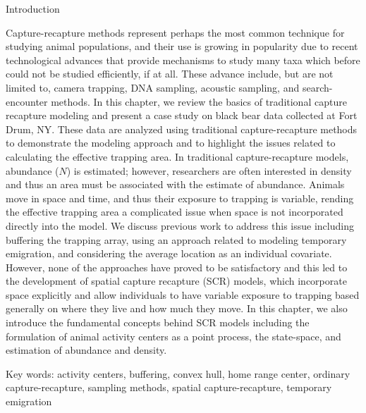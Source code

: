 
Introduction


Capture-recapture methods represent perhaps the most common technique
for studying animal populations, and their use is growing in
popularity due to recent technological advances that provide
mechanisms to study many taxa which before could not be studied
efficiently, if at all. These advance include, but are not limited to,
camera trapping, DNA sampling, acoustic sampling, and search-encounter
methods.  In this chapter, we review the basics of traditional capture
recapture modeling and present a case study on black bear data
collected at Fort Drum, NY.  These data are analyzed using traditional
capture-recapture methods to demonstrate the modeling approach and to
highlight the issues related to calculating the effective trapping
area.  In traditional capture-recapture models, abundance ($N$) is
estimated; however, researchers are often interested in density and
thus an area must be associated with the estimate of abundance.
Animals move in space and time, and thus their exposure to trapping is
variable, rending the effective trapping area a complicated issue when
space is not incorporated directly into the model.  We discuss
previous work to address this issue including buffering the trapping
array, using an approach related to modeling temporary emigration, and
considering the average location as an individual covariate.  However,
none of the approaches have proved to be satisfactory and this led to the
development of spatial capture recapture (SCR) models, which
incorporate space explicitly and allow individuals to have variable
exposure to trapping based generally on where they live and how much
they move.  In this chapter, we also introduce the fundamental
concepts behind SCR models including the formulation of animal
activity centers as a point process, the state-space, and estimation
of abundance and density.

Key words: 
activity centers, 
buffering,
convex hull,  
home range center, 
ordinary capture-recapture, 
sampling methods,
spatial capture-recapture,
temporary emigration








